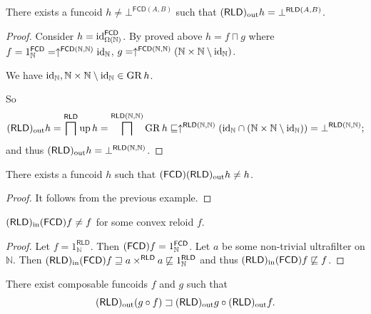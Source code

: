 \begin{example}
There exists a funcoid $h\ne\bot^{\mathsf{FCD}(A,B)}$ such that $(\mathsf{RLD})_{\mathrm{out}} h=\bot^{\mathsf{RLD}(A,B)}$.\end{example}
\begin{proof}
Consider $h={\operatorname{id}}_{\Omega(\mathbb{N})}^{\mathsf{FCD}}$. By proved above
$h=f\sqcap g$ where $f=1_{\mathbb{N}}^{\mathsf{FCD}}=\uparrow^{\mathsf{FCD}(\mathbb{N},\mathbb{N})}{\operatorname{id}}_{\mathbb{N}}$,
$g=\uparrow^{\mathsf{FCD}(\mathbb{N},\mathbb{N})}(\mathbb{N}\times\mathbb{N}\setminus{\operatorname{id}}_{\mathbb{N}})$.

We have ${\operatorname{id}}_{\mathbb{N}},\mathbb{N}\times\mathbb{N}\setminus{\operatorname{id}}_{\mathbb{N}}\in\operatorname{GR} h$.

So
\[
(\mathsf{RLD})_{\mathrm{out}} h=\bigsqcap^{\mathsf{RLD}}\operatorname{up} h=\bigsqcap^{\mathsf{RLD}(\mathbb{N},\mathbb{N})}\operatorname{GR} h\sqsubseteq\uparrow^{\mathsf{RLD}(\mathbb{N},\mathbb{N})}({\operatorname{id}}_{\mathbb{N}}\cap(\mathbb{N}\times\mathbb{N}\setminus{\operatorname{id}}_{\mathbb{N}}))=\bot^{\mathsf{RLD}(\mathbb{N},\mathbb{N})};
\]
and thus $(\mathsf{RLD})_{\mathrm{out}} h=\bot^{\mathsf{RLD}(\mathbb{N},\mathbb{N})}$.\end{proof}
\begin{example}
There exists a funcoid $h$ such that $(\mathsf{FCD})(\mathsf{RLD})_{\mathrm{out}} h\ne h$.\end{example}
\begin{proof}
It follows from the previous example.\end{proof}
\begin{example}
$(\mathsf{RLD})_{\mathrm{in}}(\mathsf{FCD}) f\ne f$ for some convex reloid $f$.\end{example}
\begin{proof}
Let $f=1_{\mathbb{N}}^{\mathsf{RLD}}$. Then $(\mathsf{FCD}) f=1_{\mathbb{N}}^{\mathsf{FCD}}$.
Let $a$ be some non-trivial ultrafilter on $\mathbb{N}$. Then $(\mathsf{RLD})_{\mathrm{in}}(\mathsf{FCD}) f\sqsupseteq a\times^{\mathsf{RLD}}a\not\sqsubseteq1_{\mathbb{N}}^{\mathsf{RLD}}$
and thus $(\mathsf{RLD})_{\mathrm{in}}(\mathsf{FCD}) f\not\sqsubseteq f$.\end{proof}
\begin{example}
There exist composable funcoids $f$ and $g$ such that
\[
(\mathsf{RLD})_{\mathrm{out}}(g\circ f)\sqsupset(\mathsf{RLD})_{\mathrm{out}} g\circ(\mathsf{RLD})_{\mathrm{out}} f.
\]
\end{example}
